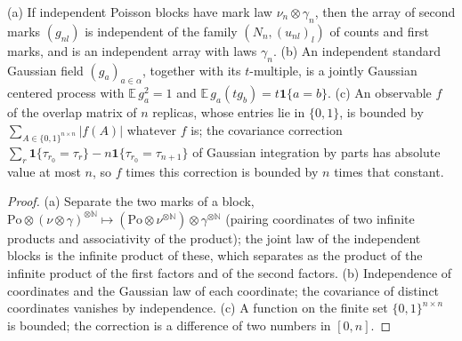 \begin{lemma}\label{lem:sg:pd-gibbs-inputs}
  \leanok
{}
(a) If independent Poisson blocks have mark law $\nu_n\otimes\gamma_n$, then the array of second marks $(g_{nl})$ is independent of the family $(N_n,(u_{nl})_l)$ of counts and first marks, and is an independent array with laws $\gamma_n$. (b) An independent standard Gaussian field $(g_a)_{a\in\alpha}$, together with its $t$-multiple, is a jointly Gaussian centered process with $\mathbb E\,g_a^2=1$ and $\mathbb E\,g_a(tg_b)=t\mathbf 1\{a=b\}$. (c) An observable $f$ of the overlap matrix of $n$ replicas, whose entries lie in $\{0,1\}$, is bounded by $\sum_{A\in\{0,1\}^{n\times n}}|f(A)|$ whatever $f$ is; the covariance correction $\sum_r\mathbf 1\{\tau_{r_0}=\tau_r\}-n\mathbf 1\{\tau_{r_0}=\tau_{n+1}\}$ of Gaussian integration by parts has absolute value at most $n$, so $f$ times this correction is bounded by $n$ times that constant.
\end{lemma}

\begin{proof}
  \leanok
(a) Separate the two marks of a block, $\mathrm{Po}\otimes(\nu\otimes\gamma)^{\otimes\mathbb N}\mapsto(\mathrm{Po}\otimes\nu^{\otimes\mathbb N})\otimes\gamma^{\otimes\mathbb N}$ (pairing coordinates of two infinite products and associativity of the product); the joint law of the independent blocks is the infinite product of these, which separates as the product of the infinite product of the first factors and of the second factors. (b) Independence of coordinates and the Gaussian law of each coordinate; the covariance of distinct coordinates vanishes by independence. (c) A function on the finite set $\{0,1\}^{n\times n}$ is bounded; the correction is a difference of two numbers in $[0,n]$.
\end{proof}

